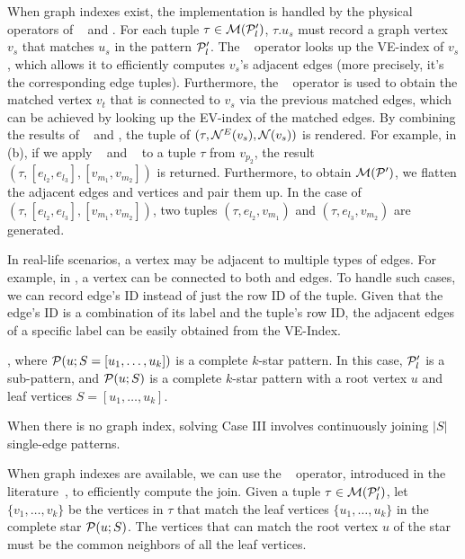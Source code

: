 When graph indexes exist, the implementation is handled by the physical operators of \expandedge~ and \getvertex. For each tuple $\tau \in \mathcal{M}(\mathcal{P}'_l)$, $\tau.u_s$ must record a graph vertex $v_s$ that matches $u_s$ in the pattern $\mathcal{P}'_l$. The \expandedge~ operator looks up the VE-index of $v_s$, which allows it to efficiently computes $v_s$'s adjacent edges (more precisely, it's the corresponding edge tuples). Furthermore, the \getvertex~ operator is used to obtain the matched vertex $v_t$ that is connected to $v_s$ via the previous matched edges, which can be achieved by looking up the EV-index of the matched edges.
By combining the results of \expandedge~ and \getvertex, the tuple of $(\tau, {\mathcal{N}}^E(v_s), {\mathcal{N}}(v_s))$ is rendered. For example, in (b), if we apply \expandedge~ and \getvertex~ to a tuple $\tau$ from $v_{p_2}$, the result $(\tau, [e_{l_2}, e_{l_3}], [v_{m_1}, v_{m_2}])$ is returned.
Furthermore, to obtain $\mathcal{M}(\mathcal{P}')$, we flatten the adjacent edges and vertices and pair them up. In the case of $(\tau, [e_{l_2}, e_{l_3}], [v_{m_1}, v_{m_2}])$, two tuples $(\tau, e_{l_2}, v_{m_1})$ and $(\tau, e_{l_3}, v_{m_2})$ are generated.

In real-life scenarios, a vertex may be adjacent to multiple types of edges. For example, in , a  vertex can be connected to both  and  edges. To handle such cases, we can record edge's ID instead of just the row ID of the tuple. Given that the edge's ID is a combination of its label and the tuple's row ID, the adjacent edges of a specific label can be easily obtained from the VE-Index.

, where $\mathcal{P}(u;S = [u_1, \ldots, u_k])$ is a complete $k$-star pattern. In this case, $\mathcal{P}'_l$ is a sub-pattern, and $\mathcal{P}(u;S)$ is a complete $k$-star pattern with a root vertex $u$ and leaf vertices $S = [u_1, \ldots, u_k]$.

When there is no graph index, solving Case III involves continuously joining $|S|$ single-edge patterns.

When graph indexes are available, we can use the \expandintersect~ operator, introduced in the literature~\cite{huge,GLogS,mhedhbi2019optimizing}, to efficiently compute the join. Given a tuple $\tau \in \mathcal{M}(\mathcal{P}'_l)$, let $\{v_1, \ldots, v_k\}$ be the vertices in $\tau$ that match the leaf vertices $\{u_1, \ldots, u_k\}$ in the complete star $\mathcal{P}(u;S)$. The vertices that can match the root vertex $u$ of the star must be the common neighbors of all the leaf vertices.


